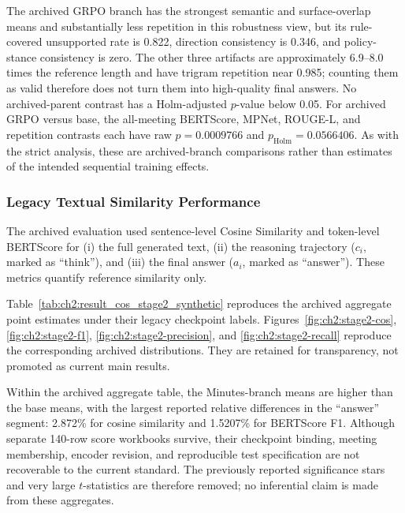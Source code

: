 The archived GRPO branch has the strongest semantic and surface-overlap means
and substantially less repetition in this robustness view, but its
rule-covered unsupported rate is 0.822, direction consistency is 0.346, and
policy-stance consistency is zero.  The other three artifacts are approximately
6.9--8.0 times the reference length and have trigram repetition near 0.985;
counting them as valid therefore does not turn them into high-quality final
answers.  No archived-parent contrast has a Holm-adjusted \(p\)-value below
0.05.  For archived GRPO versus base, the all-meeting BERTScore, MPNet,
ROUGE-L, and repetition contrasts each have raw \(p=0.0009766\) and
\(p_{\mathrm{Holm}}=0.0566406\).  As with the strict analysis, these are
archived-branch comparisons rather than estimates of the intended sequential
training effects.


\subsubsection*{Legacy Textual Similarity Performance}

The archived evaluation used sentence-level Cosine Similarity and token-level BERTScore for (i) the full generated text, (ii) the reasoning trajectory ($c_i$, marked as ``think''), and (iii) the final answer ($a_i$, marked as ``answer''). These metrics quantify reference similarity only.

Table~\ref{tab:ch2:result_cos_stage2_synthetic} reproduces the archived aggregate point estimates under their legacy checkpoint labels. Figures~\ref{fig:ch2:stage2-cos}, \ref{fig:ch2:stage2-f1}, \ref{fig:ch2:stage2-precision}, and \ref{fig:ch2:stage2-recall} reproduce the corresponding archived distributions. They are retained for transparency, not promoted as current main results.


Within the archived aggregate table, the Minutes-branch means are higher than the base means, with the largest reported relative differences in the ``answer'' segment: 2.872\% for cosine similarity and 1.5207\% for BERTScore F1. Although separate 140-row score workbooks survive, their checkpoint binding, meeting membership, encoder revision, and reproducible test specification are not recoverable to the current standard. The previously reported significance stars and very large $t$-statistics are therefore removed; no inferential claim is made from these aggregates.



